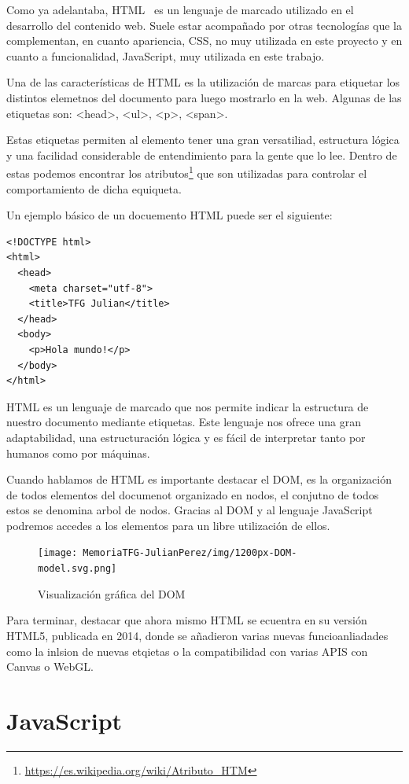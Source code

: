 \documentclass[a4paper, 12pt]{book}
\begin{document}
Como ya adelantaba, HTML~\cite{HTML} es un lenguaje de marcado utilizado en el desarrollo del contenido web. Suele estar acompañado por otras tecnologías que la complementan, en cuanto apariencia, CSS, no muy utilizada en este proyecto y en cuanto a funcionalidad, JavaScript, muy utilizada en este trabajo.

Una de las características de HTML es la utilización de marcas para etiquetar los distintos elemetnos del documento para luego mostrarlo en la web. Algunas de las etiquetas son: <head>, <ul>, <p>, <span>.

Estas etiquetas permiten al elemento tener una gran versatiliad, estructura lógica y una facilidad considerable de entendimiento para la gente que lo lee. Dentro de estas podemos encontrar los atributos\footnote{\url{https://es.wikipedia.org/wiki/Atributo_HTM}} que son utilizadas para controlar el comportamiento de dicha equiqueta.

Un ejemplo básico de un docuemento HTML puede ser el siguiente:

\begin{verbatim}
<!DOCTYPE html>
<html>
  <head>
    <meta charset="utf-8">
    <title>TFG Julian</title>
  </head>
  <body>
    <p>Hola mundo!</p>
  </body>
</html>
\end{verbatim}

HTML es un lenguaje de marcado que nos permite indicar la estructura de nuestro documento mediante etiquetas. Este lenguaje nos ofrece una gran adaptabilidad, una estructuración lógica y es fácil de interpre­tar tanto por humanos como por máquinas.

Cuando hablamos de HTML es importante destacar el DOM, es la organización de todos elementos del documenot organizado en nodos, el conjutno de todos estos se denomina arbol de nodos. Gracias al DOM y al lenguaje JavaScript podremos accedes a los elementos para un libre utilización de ellos.


\begin{figure}[H]
  \centering
  \texttt{[image: MemoriaTFG-JulianPerez/img/1200px-DOM-model.svg.png]}
  \caption{Visualización gráfica del DOM}\label{html}
\end{figure}


Para terminar, destacar que ahora mismo HTML se ecuentra en su versión HTML5, publicada en 2014, donde se añadieron varias nuevas funcioanliadades como la inlsion de nuevas etqietas o la compatibilidad con varias APIS con Canvas o WebGL.
\section{JavaScript} %
\label{sec:JavaScript}
\end{document}
